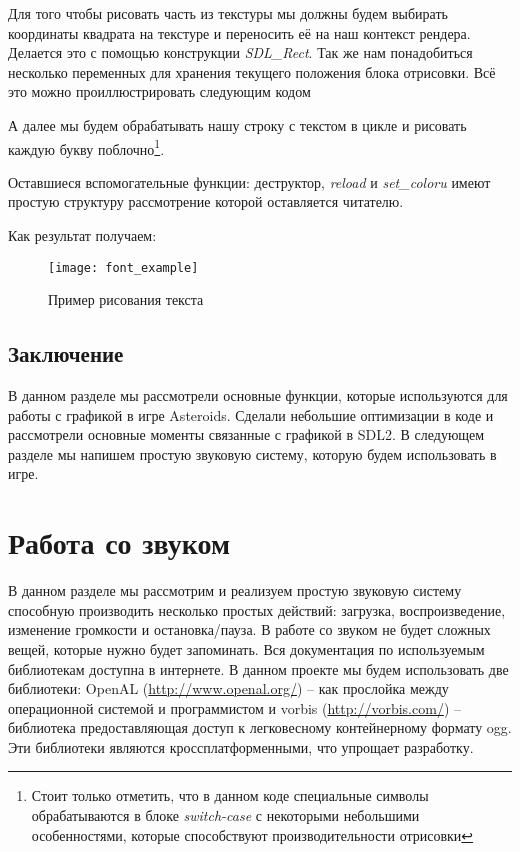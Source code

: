 Для того чтобы рисовать часть из текстуры мы должны будем выбирать координаты квадрата на 
текстуре и переносить её на наш контекст рендера. Делается это с помощью конструкции 
\emph{SDL\_Rect}. Так же нам понадобиться несколько переменных для хранения текущего 
положения блока отрисовки. Всё это можно проиллюстрировать следующим кодом


А далее мы будем обрабатывать нашу строку с текстом в цикле и рисовать каждую букву 
поблочно\footnote{Стоит только отметить, что в данном коде специальные символы обрабатываются 
в блоке \emph{switch-case} с некоторыми небольшими особенностями, которые способствуют 
производительности отрисовки}.


Оставшиеся вспомогательные функции: деструктор, \emph{reload} и 
\emph{set\_coloru} имеют простую структуру рассмотрение которой оставляется читателю.

Как результат получаем:
\begin{figure}[ht!]
    \centering
    \texttt{[image: font\_example]}
    \caption{Пример рисования текста}
    \label{img:fontExample}
\end{figure}

\section{Заключение}
В данном разделе мы рассмотрели основные функции, которые используются для работы с 
графикой в игре Asteroids. Сделали небольшие оптимизации в коде и рассмотрели основные моменты 
связанные с графикой в SDL2. В следующем разделе мы напишем простую звуковую систему, которую 
будем использовать в игре. 

\chapter{Работа со звуком}
В данном разделе мы рассмотрим и реализуем простую звуковую систему способную производить несколько 
простых действий: загрузка, воспроизведение, изменение громкости и остановка/пауза. В работе со 
звуком не будет сложных вещей, которые нужно будет запоминать. Вся документация по используемым 
библиотекам доступна в интернете. В данном проекте мы будем использовать две библиотеки:
OpenAL (\url{http://www.openal.org/}) -- как прослойка между операционной системой и программистом и 
vorbis (\url{http://vorbis.com/}) -- библиотека предоставляющая доступ к легковесному контейнерному 
формату ogg. Эти библиотеки являются кроссплатформенными, что упрощает разработку. 

